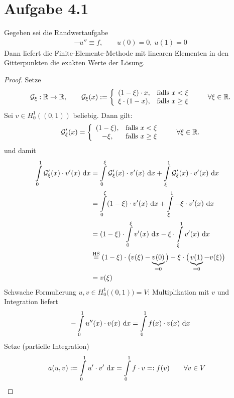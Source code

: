 \documentclass[12pt,a4paper]{article}
\author{Willi Sontopski}
\newcommand{\G}{\mathcal{G}}
\begin{document}

\section*{Aufgabe 4.1}
Gegeben sei die Randwertaufgabe
\begin{align*}
-u''\equiv f,\qquad u(0)=0,~u(1)=0
\end{align*}
Dann liefert die Finite-Elemente-Methode mit linearen Elementen in den Gitterpunkten die exakten Werte der Lösung.

\begin{proof}
Setze
\begin{align*}
\G_\xi:\R\to\R,\qquad
\G_\xi(x):=\left\lbrace\begin{array}{cl}
(1-\xi)\cdot x, &\falls x<\xi\\
\xi\cdot(1-x), &\falls x\geq\xi
\end{array}\right.\qquad\forall\xi\in\R.
\end{align*}
Sei $v\in H_0^1((0,1))$ beliebig. Dann gilt:
\begin{align*}
\G_\xi'(x)=\left\lbrace\begin{array}{cl}
(1-\xi), &\falls x<\xi\\
-\xi, &\falls x\geq\xi
\end{array}\right.\qquad\forall\xi\in\R.
\end{align*}
und damit
\begin{align*}
\int\limits_0^1\G_\xi'(x)\cdot v'(x)\d x
&=\int\limits_0^\xi\G_\xi'(x)\cdot v'(x)\d x+\int\limits_\xi^1\G_\xi'(x)\cdot v'(x)\d x\\
&=\int\limits_0^\xi (1-\xi)\cdot v'(x)\d x+\int\limits_\xi^1-\xi\cdot v'(x)\d x\\
&=(1-\xi)\cdot\int\limits_0^\xi v'(x)\d x-\xi\cdot\int\limits_\xi^1 v'(x)\d x\\
&\stackeq{\text{HS}}
(1-\xi)\cdot\big(v(\xi)-\underbrace{v(0)}_{=0}\big)-\xi\cdot\big(\underbrace{v(1)}_{=0}-v(\xi)\big)\\
&=v(\xi)
\end{align*}
Schwache Formulierung $u,v\in H_0^1\big((0,1)\big)=V$: Multiplikation mit $v$ und Integration liefert
\begin{align*}
-\int\limits_0^1 u''(x)\cdot v(x)\text{ d} x=\int\limits_0^1 f(x)\cdot v(x)\text{ d} x
\end{align*}
Setze (partielle Integration)
\begin{align*}
a(u,v)&:=\int\limits_0^1 u'\cdot v'\d x=\int\limits_0^1 f\cdot v=:f(v)\qquad\forall v\in V

\end{align*}
\end{proof}
\end{document}
